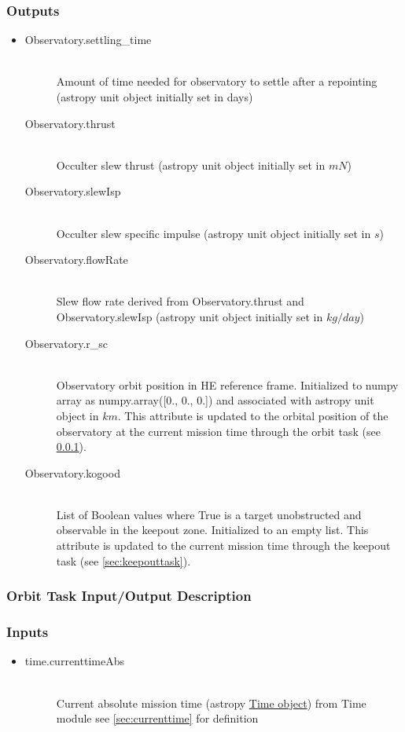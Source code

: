 \documentclass[cleanfoot]{asme2ej}
\begin{document}
\subsubsection*{Outputs}
\begin{itemize}
    \item
    \begin{description}
        \item[Observatory.settling\_time] \hfill \\
        Amount of time needed for observatory to settle after a repointing (astropy unit object initially set in days)
        \item[Observatory.thrust] \hfill \\
        Occulter slew thrust (astropy unit object initially set in $ mN $)
        \item[Observatory.slewIsp] \hfill \\
        Occulter slew specific impulse (astropy unit object initially set in $ s $)
        \item[Observatory.flowRate] \hfill \\
        Slew flow rate derived from Observatory.thrust and Observatory.slewIsp (astropy unit object initially set in $ kg/day $)
        \item[Observatory.r\_sc] \hfill \\
        Observatory orbit position in HE reference frame. Initialized to numpy array as numpy.array([0., 0., 0.]) and associated with astropy unit object in $ km $. This attribute is updated to the orbital position of the observatory at the current mission time through the orbit task (see \ref{sec:orbittask}).
        \item[Observatory.kogood] \hfill \\
        List of Boolean values where True is a target unobstructed and observable in the keepout zone. Initialized to an empty list. This attribute is updated to the current mission time through the keepout task (see \ref{sec:keepouttask}).
        
    \end{description}
\end{itemize}

\subsubsection{Orbit Task Input/Output Description} \label{sec:orbittask}

\subsubsection*{Inputs}
\begin{itemize}
    \item
    \begin{description}
        \item[time.currenttimeAbs] \hfill \\
        Current absolute mission time (astropy \href{http://astropy.readthedocs.org/en/latest/time/index.html}{Time object}) from Time module see \ref{sec:currenttime} for definition
    \end{description}
\end{itemize}
\end{document}

